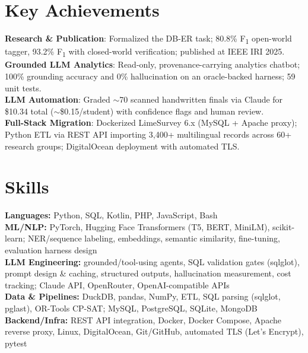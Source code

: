 \documentclass[10pt, letterpaper]{article}
\begin{document}
\section{Key Achievements}
\textbf{Research \& Publication}: Formalized the DB-ER task; 80.8\% F\textsubscript{1} open-world tagger, 93.2\% F\textsubscript{1} with closed-world verification; published at IEEE IRI 2025.\\
\textbf{Grounded LLM Analytics}: Read-only, provenance-carrying analytics chatbot; 100\% grounding accuracy and 0\% hallucination on an oracle-backed harness; 59 unit tests.\\
\textbf{LLM Automation}: Graded $\sim$70 scanned handwritten finals via Claude for \$10.34 total ($\sim$\$0.15/student) with confidence flags and human review.\\
\textbf{Full-Stack Migration}: Dockerized LimeSurvey 6.x (MySQL + Apache proxy); Python ETL via REST API importing 3,400+ multilingual records across 60+ research groups; DigitalOcean deployment with automated TLS.

\section{Skills}
\textbf{Languages:} Python, SQL, Kotlin, PHP, JavaScript, Bash\\
\textbf{ML/NLP:} PyTorch, Hugging Face Transformers (T5, BERT, MiniLM), scikit-learn; NER/sequence labeling, embeddings, semantic similarity, fine-tuning, evaluation harness design\\
\textbf{LLM Engineering:} grounded/tool-using agents, SQL validation gates (sqlglot), prompt design \& caching, structured outputs, hallucination measurement, cost tracking; Claude API, OpenRouter, OpenAI-compatible APIs\\
\textbf{Data \& Pipelines:} DuckDB, pandas, NumPy, ETL, SQL parsing (sqlglot, pglast), OR-Tools CP-SAT; MySQL, PostgreSQL, SQLite, MongoDB\\
\textbf{Backend/Infra:} REST API integration, Docker, Docker Compose, Apache reverse proxy, Linux, DigitalOcean, Git/GitHub, automated TLS (Let's Encrypt), pytest
\end{document}
